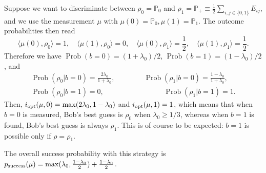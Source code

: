 \documentclass[12pt]{report}
\newcommand{\PP}{\mathbb{P}}
\DeclareMathOperator{\Prob}{Prob}
\begin{document}
\begin{example}
	Suppose we want to discriminate between $\rho_0=\PP_0$ and $\rho_1=\PP_+\equiv \frac12\sum_{i,j\in\{0,1\}}E_{ij}$, and we use the measurement $\mu$ with $\mu(0)=\PP_0, \mu(1)=\PP_1$.
	The outcome probabilities then read
	\begin{equation}
		\langle \mu(0),\rho_0\rangle = 1,
		\quad
		\langle \mu(1),\rho_0\rangle = 0,
		\quad
		\langle \mu(0),\rho_1\rangle = \frac12,
		\quad
		\langle \mu(1),\rho_1\rangle = \frac12.
	\end{equation}
	Therefore we have
	$\Prob(b=0) = (1+\lambda_0)/2$,
	$\Prob(b=1) = (1-\lambda_0)/2$, and 
	\begin{equation}
	\begin{gathered}
		\Prob(\rho_0|b=0) = \frac{2\lambda_0}{1+\lambda_0},
		\qquad\qquad
		\Prob(\rho_1|b=0) = \frac{1-\lambda_0}{1+\lambda_0}, \\
		\Prob(\rho_0|b=1) = 0,\qquad\qquad\,\,
		\qquad\qquad
		\Prob(\rho_1|b=1) = 1.
	\end{gathered}
	\end{equation}
	Then, $i_{\rm opt}(\mu,0)= \max(2\lambda_0,1-\lambda_0)$
	and $i_{\rm opt}(\mu,1)= 1$, which means that when $b=0$ is measured, Bob's best guess is $\rho_0$ when $\lambda_0\ge1/3$, whereas when $b=1$ is found, Bob's best guess is always $\rho_1$.
	This is of course to be expected: $b=1$ is possible only if $\rho=\rho_1$.

	The overall success probability with this strategy is
	$p_{\rm success}(\mu) = \max(\lambda_0,\frac{1-\lambda_0}{2})+\frac{1-\lambda_0}{2}$.


\end{example}
\end{document}
